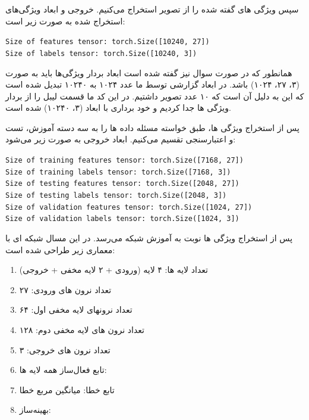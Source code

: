 \begin{qsolve}
	سپس ویژگی های گفته شده را از تصویر استخراج می‌کنیم. خروجی و ابعاد ویژگی‌های استخراج شده به صورت زیر است:
	
	\begin{latin}
		\texttt{Size of features tensor: torch.Size([10240, 27])}\\
		\texttt{Size of labels tensor: torch.Size([10240, 3])}
	\end{latin}
	همانطور که در صورت سوال نیز گفته شده است ابعاد بردار ویژگی‌ها باید به صورت (۳، ۲۷، ۱۰۲۴) باشد. در ابعاد گزارشی توسط ما عدد ۱۰۲۴ به ۱۰۲۴۰ تبدیل شده است که این به دلیل آن است که ۱۰ عدد تصویر داشتیم. در این کد ما قسمت لیبل را از بردار ویژگی ها جدا کردیم و خود برداری با ابعاد (۳، ۱۰۲۴۰) شده است.
	
	پس از استخراج ویژگی ها، طبق خواسته مسئله داده ها را به سه دسته آموزش، تست و اعتبارسنجی تقسیم می‌کنیم. ابعاد خروجی به صورت زیر می‌شود:
	
	\begin{latin}
		\texttt{Size of training features tensor: torch.Size([7168, 27])} \\
		\texttt{Size of training labels tensor: torch.Size([7168, 3])} \\
		\texttt{Size of testing features tensor: torch.Size([2048, 27])} \\
		\texttt{Size of testing labels tensor: torch.Size([2048, 3])} \\
		\texttt{Size of validation features tensor: torch.Size([1024, 27])} \\
		\texttt{Size of validation labels tensor: torch.Size([1024, 3])} \\
	\end{latin}
	
	پس از استخراج ویژگی ها نوبت به آموزش شبکه می‌رسد. در این مسال شبکه ای با معماری زیر طراحی شده است:
	
	\begin{enumerate}
		\item تعداد لایه ها: ۴ لایه (ورودی + ۲ لایه مخفی + خروجی)
		\item تعداد نرون های ورودی: ۲۷
		\item تعداد نرونهای لایه مخفی اول:‌ ۶۴
		\item تعداد نرون های لایه مخفی دوم: ۱۲۸
		\item تعداد نرون های خروجی: ۳
		\item تابع فعال‌ساز همه لایه ها: 
		\item تابع خطا: میانگین مربع خطا
		\item بهینه‌ساز: 
	\end{enumerate}
	

\end{qsolve}
